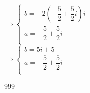 \documentclass[a4paper]{article}
\begin{document}
$\Rightarrow \left \{
\begin{array}{l}
b = -2\left(-\dfrac{5}{2} + \dfrac{5}{2}i\right)i\\
a = -\dfrac{5}{2} + \dfrac{5}{2}i\\
\end{array}
\right.$ \\

$\Rightarrow \left \{
\begin{array}{l}
b = 5i + 5\\
a = -\dfrac{5}{2} + \dfrac{5}{2}i\\
\end{array}
\right.$ \\

\begin{thebibliography}{999}
\end{thebibliography}
\end{document}
